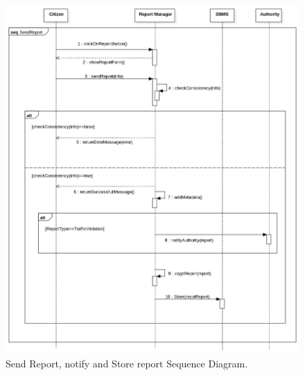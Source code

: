 \documentclass{report}
\begin{document}
\begin{figure}[ht!]
\begin{center}
\includegraphics[width=\textwidth]{./img/SendReportSdd.png}
\end{center}
\caption{Send Report, notify and Store report Sequence Diagram.}
\label{fig:SequenceDiagram3}
\end{figure}
\newpage
\end{document}
